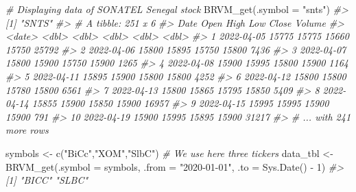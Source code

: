 \documentclass[
]{article}
\newenvironment{Shaded}{\begin{snugshade}}{\end{snugshade}}
\newcommand{\AttributeTok}[1]{\textcolor[rgb]{0.77,0.63,0.00}{#1}}
\newcommand{\CommentTok}[1]{\textcolor[rgb]{0.56,0.35,0.01}{\textit{#1}}}
\newcommand{\DecValTok}[1]{\textcolor[rgb]{0.00,0.00,0.81}{#1}}
\newcommand{\FunctionTok}[1]{\textcolor[rgb]{0.00,0.00,0.00}{#1}}
\newcommand{\NormalTok}[1]{#1}
\newcommand{\OtherTok}[1]{\textcolor[rgb]{0.56,0.35,0.01}{#1}}
\newcommand{\SpecialCharTok}[1]{\textcolor[rgb]{0.00,0.00,0.00}{#1}}
\newcommand{\StringTok}[1]{\textcolor[rgb]{0.31,0.60,0.02}{#1}}
\begin{document}
\begin{Shaded}
\begin{Highlighting}[]

\CommentTok{\#\textquotesingle{} Displaying data of SONATEL Senegal stock}
\FunctionTok{BRVM\_get}\NormalTok{(}\AttributeTok{.symbol =} \StringTok{"snts"}\NormalTok{)}
\CommentTok{\#\textgreater{} [1] "SNTS"}
\CommentTok{\#\textgreater{} \# A tibble: 251 x 6}
\CommentTok{\#\textgreater{}    Date        Open  High   Low Close Volume}
\CommentTok{\#\textgreater{}    \textless{}date\textgreater{}     \textless{}dbl\textgreater{} \textless{}dbl\textgreater{} \textless{}dbl\textgreater{} \textless{}dbl\textgreater{}  \textless{}dbl\textgreater{}}
\CommentTok{\#\textgreater{}  1 2022{-}04{-}05 15775 15775 15660 15750  25792}
\CommentTok{\#\textgreater{}  2 2022{-}04{-}06 15800 15895 15750 15800   7436}
\CommentTok{\#\textgreater{}  3 2022{-}04{-}07 15800 15900 15750 15900   1265}
\CommentTok{\#\textgreater{}  4 2022{-}04{-}08 15900 15995 15800 15900   1164}
\CommentTok{\#\textgreater{}  5 2022{-}04{-}11 15895 15900 15800 15800   4252}
\CommentTok{\#\textgreater{}  6 2022{-}04{-}12 15800 15800 15780 15800   6561}
\CommentTok{\#\textgreater{}  7 2022{-}04{-}13 15800 15865 15795 15850   5409}
\CommentTok{\#\textgreater{}  8 2022{-}04{-}14 15855 15900 15850 15900  16957}
\CommentTok{\#\textgreater{}  9 2022{-}04{-}15 15995 15995 15900 15900    791}
\CommentTok{\#\textgreater{} 10 2022{-}04{-}19 15900 15995 15895 15900  31217}
\CommentTok{\#\textgreater{} \# ... with 241 more rows}

\NormalTok{symbols }\OtherTok{\textless{}{-}} \FunctionTok{c}\NormalTok{(}\StringTok{"BiCc"}\NormalTok{,}\StringTok{"XOM"}\NormalTok{,}\StringTok{"SlbC"}\NormalTok{)   }\CommentTok{\# We use here three tickers}
\NormalTok{data\_tbl }\OtherTok{\textless{}{-}} \FunctionTok{BRVM\_get}\NormalTok{(}\AttributeTok{.symbol =}\NormalTok{ symbols, }\AttributeTok{.from =} \StringTok{"2020{-}01{-}01"}\NormalTok{, }\AttributeTok{.to =} \FunctionTok{Sys.Date}\NormalTok{() }\SpecialCharTok{{-}} \DecValTok{1}\NormalTok{)}
\CommentTok{\#\textgreater{} [1] "BICC" "SLBC"}


\end{Highlighting}
\end{Shaded}
\end{document}
